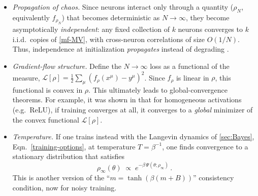 \documentclass[11pt]{article}
\newcommand{\CL}{{\mathcal L}}
\begin{document}
\begin{itemize}
    \item \emph{Propagation of chaos.} Since neurons interact only through a quantity ($\rho_N$, equivalently $f_{\rho_N}$) that becomes deterministic as $N\to\infty$, they become asymptotically \emph{independent}: any fixed collection of $k$ neurons converges to $k$ i.i.d.\ copies of \eqref{mf-MV}, with cross-neuron correlations of size $O(1/N)$. Thus, independence at initialization \emph{propagates} instead of degrading \cite{sznitman1991topics}. %
    \item \emph{Gradient-flow structure.} Define the $N\to\infty$ loss as a functional of the measure, $\CL[\rho] = \frac{1}{2}\sum_\mu (f_\rho(x^\mu)-y^\mu)^2$. Since $f_\rho$ is linear in $\rho$, this functional is convex in $\rho$. %
    This ultimately leads to global-convergence theorems. For example, it was shown in \cite{chizat2018global} that for homogeneous activations (e.g.\ ReLU), if training converges at all, it converges to a \emph{global} minimizer of the convex functional $\CL[\rho]$.
    \item \emph{Temperature.} If one trains instead with the Langevin dynamics of \cref{sec:Bayes}, Eqn.~\eqref{training-options}, at temperature $T=\beta^{-1}$, one finds convergence to a stationary distribution that satisfies \cite{mei2018mean}
    \begin{equation} \label{mf-gibbs}
        \rho_\infty(\theta) \;\propto\; e^{\textstyle-\beta\,\Psi(\theta;\rho_\infty)}\,.
    \end{equation}
    This is another version of the ``$m=\tanh(\beta(m+B))$'' consistency condition, now for noisy training.
\end{itemize}
\end{document}
